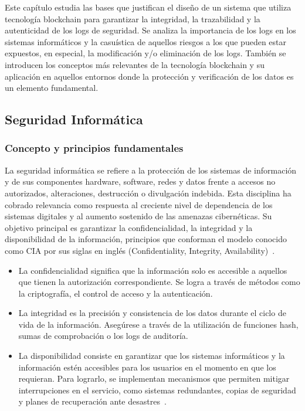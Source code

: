 Este capítulo estudia las bases que justifican el diseño de un sistema que utiliza tecnología blockchain para garantizar la integridad, la trazabilidad y la autenticidad de los logs de seguridad. Se analiza la importancia de los logs en los sistemas informáticos y la casuística de aquellos riesgos a los que pueden estar expuestos, en especial, la modificación y/o eliminación de los logs. También se introducen los conceptos más relevantes de la tecnología blockchain y su aplicación en aquellos entornos donde la protección y verificación de los datos es un elemento fundamental.
\subsection{Seguridad Informática}
\subsubsection{Concepto y principios fundamentales}
La seguridad informática se refiere a la protección de los sistemas de información y de sus componentes hardware, software, redes y datos frente a accesos no autorizados, alteraciones, destrucción o divulgación indebida. Esta disciplina ha cobrado relevancia como respuesta al creciente nivel de dependencia de los sistemas digitales y al aumento sostenido de las amenazas cibernéticas. Su objetivo principal es garantizar la confidencialidad, la integridad y la disponibilidad de la información, principios que conforman el modelo conocido como CIA por sus siglas en inglés (Confidentiality, Integrity, Availability)~\cite{Pfleeger2007}.
\begin{itemize}
    \item La confidencialidad significa que la información solo es accesible a aquellos que tienen la autorización correspondiente. Se logra a través de métodos como la criptografía, el control de acceso y la autenticación.
    \item La integridad es la precisión y consistencia de los datos durante el ciclo de vida de la información. Asegúrese a través de la utilización de funciones hash, sumas de comprobación o los logs de auditoría.
    \item La disponibilidad consiste en garantizar que los sistemas informáticos y la información estén accesibles para los usuarios en el momento en que los requieran. Para lograrlo, se implementan mecanismos que permiten mitigar interrupciones en el servicio, como sistemas redundantes, copias de seguridad y planes de recuperación ante desastres~\cite{Stallings2017}.
\end{itemize}
